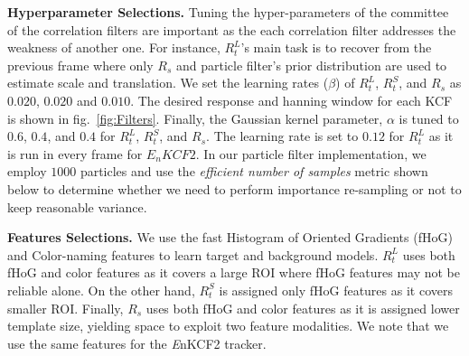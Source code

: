 \documentclass{bmvc2k}
\begin{document}
\textbf{Hyperparameter Selections.} Tuning the hyper-parameters of the
committee of the correlation filters are important as the each
correlation filter addresses the weakness of another one. For
instance, $R_{t}^{L}$'s main task is to recover from the previous
frame where only $R_{s}$ and particle filter's prior distribution are
used to estimate scale and translation. We set the learning rates
($\beta$) of $R_{t}^{L}$, $R_{t}^{S}$, and $R_{s}$ as $0.020$, $0.020$
and $0.010$. The desired response and hanning window for each KCF is
shown in fig.~\ref{fig:Filters}. Finally, the Gaussian kernel
parameter, $\alpha$ is tuned to $0.6$, $0.4$, and $0.4$ for
$R_{t}^{L}$, $R_{t}^{S}$, and $R_{s}$. The learning rate is set to $0.12$
for $R_{t}^{L}$ as it is run in every frame for $E_{n}KCF2$.
In our particle filter implementation, we employ $1000$ particles and use the
\textit{efficient number of samples} metric shown below to determine
whether we need to perform importance re-sampling or not to keep
reasonable variance.

\textbf{Features Selections.} We use the fast Histogram of Oriented
Gradients (fHoG)\cite{felzenszwalb2010object} and
Color-naming\cite{van2009learning} features to learn target and
background models. $R_{t}^{L}$ uses both fHoG and color features as it
covers a large ROI where fHoG features may not be reliable alone. On
the other hand, $R_{t}^{S}$ is assigned only fHoG features as it
covers smaller ROI. Finally, $R_{s}$ uses both fHoG and color features
as it is assigned lower template size, yielding space to exploit two
feature modalities. We note that we use the same features for the {\it E}nKCF2 tracker.
\end{document}
